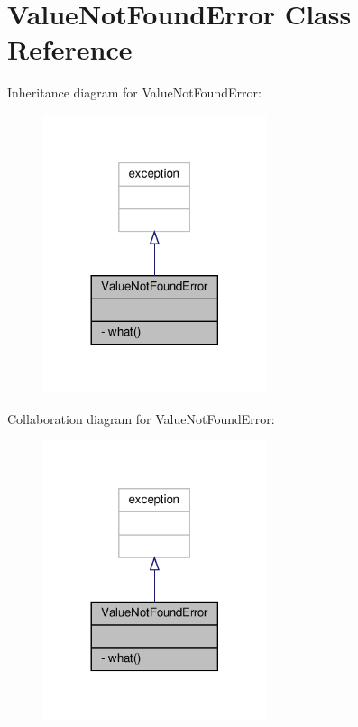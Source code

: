 \hypertarget{classValueNotFoundError}{}\section{Value\+Not\+Found\+Error Class Reference}
\label{classValueNotFoundError}


Inheritance diagram for Value\+Not\+Found\+Error\+:\nopagebreak
\begin{figure}[H]
\begin{center}
\leavevmode
\includegraphics[width=185pt]{classValueNotFoundError__inherit__graph}
\end{center}
\end{figure}


Collaboration diagram for Value\+Not\+Found\+Error\+:\nopagebreak
\begin{figure}[H]
\begin{center}
\leavevmode
\includegraphics[width=185pt]{classValueNotFoundError__coll__graph}
\end{center}
\end{figure}
